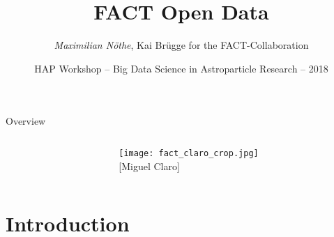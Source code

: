 \documentclass[compress, 9pt, aspectratio=1610, professionalfonts]{beamer}
\author[M.\ Nöthe]{\textit{Maximilian Nöthe}, Kai Brügge for the FACT-Collaboration}
\date[20.2.2018]{HAP Workshop – Big Data Science in Astroparticle Research – 2018}
\title{FACT Open Data}
\institute[%
  {\texttt{[image: logos/fact.pdf]}}%
  \hspace{1em}%
  {\texttt{[image: logos/sfb876.pdf]}}%
  \hspace{1em}%
  {\texttt{[image: logos/e5logo.pdf]}}%
]{}
\begin{document}
\begin{frame}
  \maketitle
\end{frame}

\begin{frame}{Overview}
  \begin{columns}[c, onlytextwidth]
    \begin{column}{0.66\textwidth}
      \linespread{1.5}
      \tableofcontents[hideallsubsections]
    \end{column}
    \hfill
    \begin{column}{0.33\textwidth}
      \raggedleft
      \texttt{[image: fact\_claro\_crop.jpg]}\\
      {\tiny[Miguel Claro]}
    \end{column}
  \end{columns}
\end{frame}

\section{Introduction}
\begin{frame}
  \begin{center}
    \begin{tikzpicture}
      
    \end{tikzpicture}
  \end{center}
\end{frame}
\end{document}

